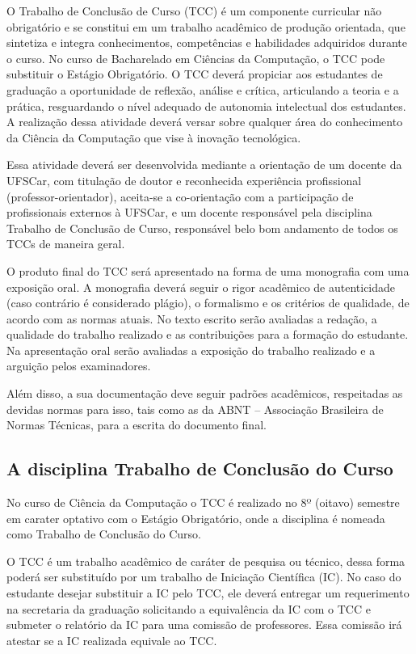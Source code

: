 

O Trabalho de Conclusão de Curso (TCC) é um componente curricular não obrigatório e se constitui em um trabalho acadêmico de produção orientada, que sintetiza e integra conhecimentos, competências e habilidades adquiridos durante o curso. No curso de Bacharelado em Ciências da Computação, o TCC pode substituir o Estágio Obrigatório. O TCC deverá propiciar aos estudantes de graduação a oportunidade de reflexão, análise e crítica, articulando a teoria e a prática, resguardando o nível adequado de autonomia intelectual dos estudantes. A realização dessa atividade deverá versar sobre qualquer área do conhecimento da Ciência da Computação que vise à inovação tecnológica.

Essa atividade deverá ser desenvolvida mediante a orientação de um docente da UFSCar, com titulação de doutor e reconhecida experiência profissional (professor-orientador), aceita-se a co-orientação com a participação de profissionais externos à UFSCar, e um docente responsável pela disciplina Trabalho de Conclusão de Curso, responsável belo bom andamento de todos os TCCs de maneira geral.

O produto final do TCC será apresentado na forma de uma monografia com uma exposição oral. A monografia deverá seguir o rigor acadêmico de autenticidade (caso contrário é considerado plágio), o formalismo e os critérios de qualidade, de acordo com as normas atuais. No texto escrito serão avaliadas a redação, a qualidade do trabalho realizado e as contribuições para a formação do estudante. Na apresentação oral serão avaliadas a exposição do trabalho realizado e a arguição pelos examinadores.

Além disso, a sua documentação deve seguir padrões acadêmicos, respeitadas as devidas normas para isso, tais como as da ABNT – Associação Brasileira de Normas Técnicas, para a escrita do documento final.



\subsection{A disciplina Trabalho de Conclusão do Curso}

No curso de Ciência da Computação o TCC é realizado no 8º (oitavo) semestre em carater optativo com o Estágio Obrigatório, onde a disciplina é nomeada como Trabalho de Conclusão do Curso. 

O TCC é um trabalho acadêmico de caráter de pesquisa ou técnico, dessa forma poderá ser substituído por um trabalho de Iniciação Científica (IC). No caso do estudante desejar substituir a IC pelo TCC, ele deverá entregar um requerimento na secretaria da graduação solicitando a equivalência da IC com o TCC e submeter o relatório da IC para uma comissão de professores. Essa comissão irá atestar se a IC realizada equivale ao TCC.

